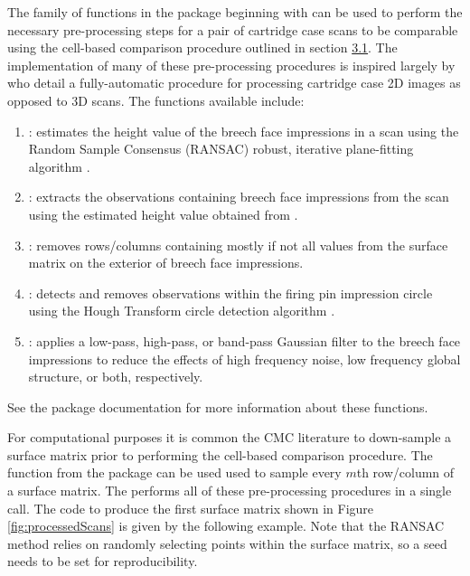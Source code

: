The family of functions in the  package beginning with
 can be used to perform the necessary pre-processing
steps for a pair of cartridge case scans to be comparable using the
cell-based comparison procedure outlined in section
\protect\hyperlink{comparisonProcedure}{3.1}. The implementation of many
of these pre-processing procedures is inspired largely by
\citet{tai_fully_2018} who detail a fully-automatic procedure for
processing cartridge case 2D images as opposed to 3D scans. The
functions available include:

\begin{enumerate}
\item {}: estimates the height value of the breech face impressions in a scan using the Random Sample Consensus (RANSAC) robust, iterative plane-fitting algorithm \citep{ransac}.

\item {}: extracts the observations containing breech face impressions from the scan using the estimated height value obtained from .

\item {}: removes rows/columns containing mostly if not all  values from the surface matrix on the exterior of breech face impressions.

\item {}: detects and removes observations within the firing pin impression circle using the Hough Transform circle detection algorithm \citep{hough}.

\item {}: applies a low-pass, high-pass, or band-pass Gaussian filter to the breech face impressions to reduce the effects of high frequency noise, low frequency global structure, or both, respectively.
\end{enumerate}

See the  package documentation for more information about
these functions.

For computational purposes it is common the CMC literature to
down-sample a surface matrix prior to performing the cell-based
comparison procedure. The  function from the
 package can be used used to sample every \(m\)th
row/column of a surface matrix. The
 performs all of these
pre-processing procedures in a single call. The code to produce the
first surface matrix shown in Figure \ref{fig:processedScans} is given
by the following example. Note that the RANSAC method relies on randomly
selecting points within the surface matrix, so a seed needs to be set
for reproducibility.

